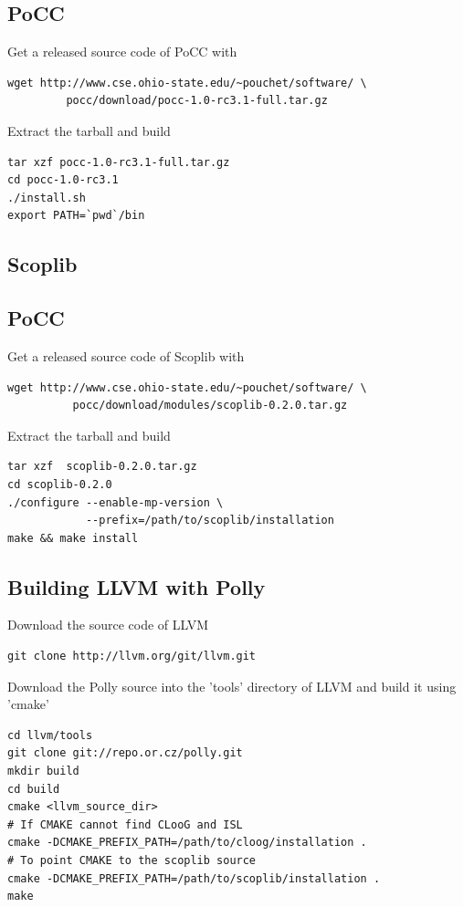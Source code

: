 \documentclass[MTech]{iitmdiss}
\begin{document}
\subsection{PoCC}
\noindent
Get a released source code of PoCC with
\begin{lstlisting}
wget http://www.cse.ohio-state.edu/~pouchet/software/ \
	     pocc/download/pocc-1.0-rc3.1-full.tar.gz

\end{lstlisting}
\noindent
Extract the tarball and build
\begin{lstlisting}
tar xzf pocc-1.0-rc3.1-full.tar.gz
cd pocc-1.0-rc3.1
./install.sh
export PATH=`pwd`/bin
\end{lstlisting}

\subsection{Scoplib}
\subsection{PoCC}
\noindent
Get a released source code of Scoplib with
\begin{lstlisting}
wget http://www.cse.ohio-state.edu/~pouchet/software/ \
          pocc/download/modules/scoplib-0.2.0.tar.gz
\end{lstlisting}
\noindent
Extract the tarball and build
\begin{lstlisting}
tar xzf  scoplib-0.2.0.tar.gz
cd scoplib-0.2.0
./configure --enable-mp-version \
            --prefix=/path/to/scoplib/installation 
make && make install
\end{lstlisting}

\subsection{Building LLVM with Polly}
\noindent
Download the source code of LLVM
\begin{lstlisting}
git clone http://llvm.org/git/llvm.git
\end{lstlisting}
\noindent
Download the Polly source into the 'tools' directory of LLVM and
build it using 'cmake'
\begin{lstlisting}
cd llvm/tools
git clone git://repo.or.cz/polly.git
mkdir build
cd build
cmake <llvm_source_dir>
# If CMAKE cannot find CLooG and ISL
cmake -DCMAKE_PREFIX_PATH=/path/to/cloog/installation . 
# To point CMAKE to the scoplib source
cmake -DCMAKE_PREFIX_PATH=/path/to/scoplib/installation . 
make
\end{lstlisting}
\end{document}
